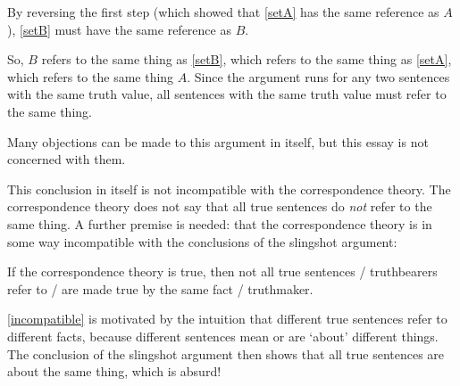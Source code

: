 By reversing the first step (which showed that \ref{setA} has the same reference as $A$), \ref{setB} must have the same reference as $B$.

So, $B$ refers to the same thing as \ref{setB}, which refers to the same thing as \ref{setA}, which refers to the same thing $A$.
Since the argument runs for any two sentences with the same truth value, all sentences with the same truth value must refer to the same thing.

Many objections can be made to this argument in itself, but this essay is not concerned with them.

This conclusion in itself is not incompatible with the correspondence theory.
The correspondence theory does not say that all true sentences do \emph{not} refer to the same thing.
A further premise is needed: that the correspondence theory is in some way incompatible with the conclusions of the slingshot argument:


	\begin{thesis} \label{incompatible}
	If the correspondence theory is true, then not all true sentences / truthbearers refer to / are made true by the same fact / truthmaker.
	\end{thesis}

\ref{incompatible} is motivated by the intuition that different true sentences refer to different facts, because different sentences mean or are `about' different things.
The conclusion of the slingshot argument then shows that all true sentences are about the same thing, which is absurd!
